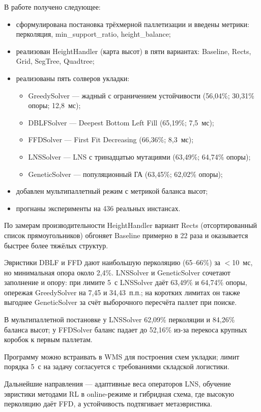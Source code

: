 \Conclusion %

В работе получено следующее:
\begin{itemize}
  \item сформулирована постановка трёхмерной паллетизации и введены метрики: перколяция, min\_support\_ratio, height\_balance;
  \item реализован HeightHandler (карта высот) в пяти вариантах: Baseline, Rects, Grid, SegTree, Quadtree;
  \item реализованы пять солверов укладки:
  \begin{itemize}
    \item GreedySolver --- жадный с ограничением устойчивости (56,04\%; 30,31\% опоры; 12,8~мс);
    \item DBLFSolver --- Deepest Bottom Left Fill (65,19\%; 7,5~мс);
    \item FFDSolver --- First Fit Decreasing (66,36\%; 8,3~мс);
    \item LNSSolver --- LNS с тринадцатью мутациями (63,49\%; 64,74\% опоры);
    \item GeneticSolver --- популяционный ГА (63,45\%; 62,02\% опоры);
  \end{itemize}
  \item добавлен мультипаллетный режим с метрикой баланса высот;
  \item прогнаны эксперименты на 436 реальных инстансах.
\end{itemize}

По замерам производительности HeightHandler вариант Rects (отсортированный список прямоугольников) обгоняет Baseline примерно в 22 раза и оказывается быстрее более тяжёлых структур.

Эвристики DBLF и FFD дают наибольшую перколяцию (65--66\%) за $<$10~мс, но минимальная опора около 2,4\%. LNSSolver и GeneticSolver сочетают заполнение и опору: при лимите 5~с LNSSolver даёт 63,49\% и 64,74\% опоры, опережая GreedySolver на 7,45 и 34,43~п.п.; на коротких лимитах он также выгоднее GeneticSolver за счёт выборочного пересчёта паллет при поиске.

В мультипаллетной постановке у LNSSolver 62,09\% перколяции и 84,26\% баланса высот; у FFDSolver баланс падает до 52,16\% из-за перекоса крупных коробок к первым паллетам.

Программу можно встраивать в WMS для построения схем укладки; лимит порядка 5~с на задачу согласуется с требованиями складской логистики.

Дальнейшие направления --- адаптивные веса операторов LNS, обучение эвристики методами RL в online-режиме и гибридная схема, где высокую перколяцию даёт FFD, а устойчивость подтягивает метаэвристика.

